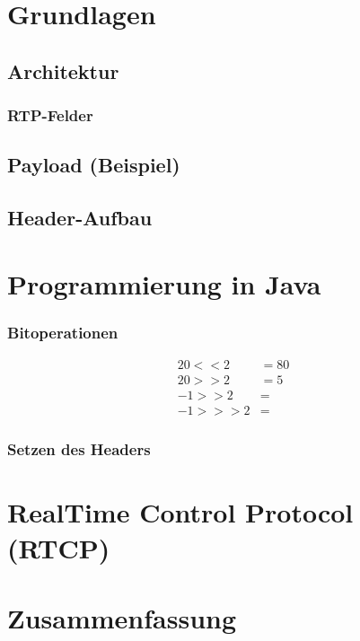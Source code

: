\section{Grundlagen}
\subsection{Architektur}
\subsubsection*{RTP-Felder}
\subsection{Payload (Beispiel)}
\subsection{Header-Aufbau}
\section{Programmierung in Java}
\subsubsection{Bitoperationen}
\begin{align*}
20 << 2 &= 80\\
20 >> 2 &= 5\\
-1 >> 2 &= \\
-1 >>> 2 &=
\end{align*}
\subsubsection{Setzen des Headers}

\section{RealTime Control Protocol (RTCP)}

\section{Zusammenfassung}






